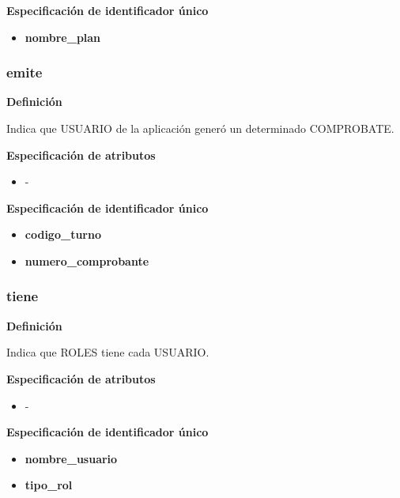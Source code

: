 \documentclass[a4paper,11pt]{article}
\begin{document}
\textbf{Especificación de identificador único}

\begin{itemize}

    \item \textbf{nombre\_plan}

\end{itemize}


\subsubsection{\textbf{emite}}

\textbf{Definición}

Indica que USUARIO de la aplicación generó un determinado COMPROBATE.

\textbf{Especificación de atributos}

\begin{itemize}

    \item -

\end{itemize}

\textbf{Especificación de identificador único}

\begin{itemize}

    \item \textbf{codigo\_turno}

    \item \textbf{numero\_comprobante}

\end{itemize}

\subsubsection{\textbf{tiene}}

\textbf{Definición}

Indica que ROLES tiene cada USUARIO.

\textbf{Especificación de atributos}

\begin{itemize}

    \item -

\end{itemize}

\textbf{Especificación de identificador único}

\begin{itemize}

    \item \textbf{nombre\_usuario}
   
    \item \textbf{tipo\_rol}
    
\end{itemize}
\end{document}
